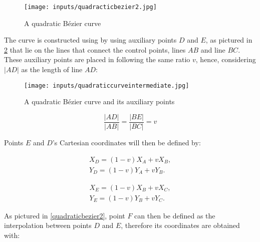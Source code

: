 \documentclass[cic,tc,english]{iiufrgs}
\begin{document}
\begin{itemize}
\begin{figure}[h!]
    \caption{A quadratic Bézier curve}
    \begin{center}
        \texttt{[image: inputs/quadracticbezier2.jpg]}
    \end{center}
    \label{quadraticbezier1}
\end{figure}

The curve is constructed using by using auxiliary points $D$ and $E$, as pictured in \cref{quadraticintermediate} that lie on the lines that connect the control points, lines $AB$ and line $BC$. These auxiliary points are placed in following the same ratio $v$, hence, considering $|AD|$ as the length of line $AD$:

\begin{figure}[h!]
    \caption{A quadratic Bézier curve and its auxiliary points}
    \begin{center}
        \texttt{[image: inputs/quadraticcurveintermediate.jpg]}
    \end{center}
    \label{quadraticintermediate}
\end{figure}

\begin{equation}
    \frac{|AD|}{|AB|} = \frac{|BE|}{|BC|} = v
\end{equation}

Points $E$ and $D$'s Cartesian coordinates will then be defined by:

\begin{equation}
    \begin{array}{c}
        {X_D} = (1-v){X_A} + v{X_B}, \\
        {Y_D} = (1-v){Y_A} + v{Y_B}.
    \end{array}
    \label{bezier:d}
\end{equation}

\vspace{0.5em}

\begin{equation}
    \begin{array}{c}
        {X_E} = (1-v){X_B} + v{X_C}, \\
        {Y_E} = (1-v){Y_B} + v{Y_C}.
    \end{array}
    \label{bezier:e}
\end{equation}

As pictured in \cref{quadraticbezier2}, point $F$ can then be defined as the interpolation between points $D$ and $E$, therefore its coordinates are obtained with:


\end{itemize}
\end{document}
